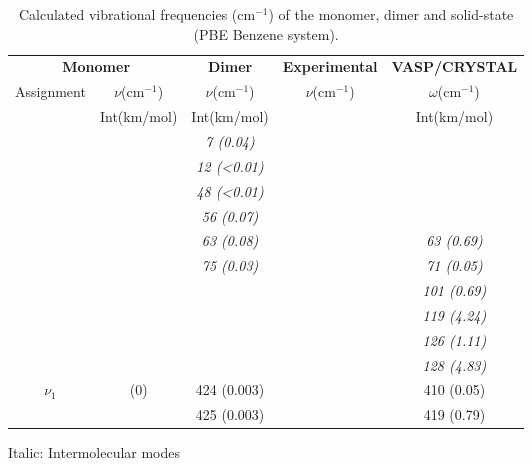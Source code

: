  				\begin{table}[H]
 					\caption{ Calculated vibrational frequencies (cm$^{-1}$) of the monomer, dimer and solid-state (PBE Benzene system).}  \label{table-freqBen}
 					\begin{center}
 						\begin{threeparttable}
 						\begin{tabular}{c c c c c}
 							\toprule
 							\multicolumn{2}{p{4.5cm}}{\centering \textbf{Monomer}} & \textbf{Dimer} & \multicolumn{1}{p{4cm}}{\centering \textbf{Experimental}} & \textbf{VASP/CRYSTAL}\\
 							Assignment & $\nu$(cm$^{-1}$) & $\nu$(cm$^{-1}$) & $\nu$(cm$^{-1}$) & $\omega$(cm$^{-1}$) \\
 							& Int(km/mol) & Int(km/mol) & & Int(km/mol) \\
 							\midrule
 							&  &  \textit{7 (0.04)}& & \\
 							&  & \textit{12 (<0.01)} &  & \\
 							&  & \textit{48 (<0.01)}&  & \\
 							& & \textit{56 (0.07)} &  & \\
 							&  & \textit{63 (0.08)}&  & \textit{63 (0.69)} \\
 							&  & \textit{75 (0.03)} &  & \textit{71 (0.05)} \\
 							&   &  &    &  \textit{101 (0.69)}\\
 							&   & &  & \textit{119 (4.24)}\\
 							&   &   &   &  \textit{126 (1.11)}\\
 							&   &   &   & \textit{128 (4.83)}\\
 							\multirow{2}{2cm}{\centering $\nu_{1}$}& \multirow{2}{2cm}{\centering 426 (0)} & 424 (0.003) &   & 410 (0.05)\\
 							&   &   425 (0.003) &  & 419 (0.79)\\ 
 							\bottomrule	    
 						\end{tabular}
 						
 						\begin{tablenotes}
 							\item[] Italic: Intermolecular modes
 						\end{tablenotes}
 					\end{threeparttable}
 					\end{center}
 				\end{table}	
 				
 	
 	
